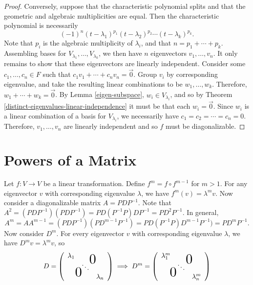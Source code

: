 \begin{proof}
    Conversely, suppose that the characteristic polynomial splits and that the geometric and algebraic multiplicities are equal. Then the characteristic polynomial is necessarily
    \[(-1)^n(t-\lambda_1)^{p_1}(t-\lambda_2)^{p_2}\cdots(t-\lambda_k)^{p_k}.\]
    Note that $p_i$ is the algebraic multiplicity of $\lambda_i$, and that $n = p_1 + \cdots + p_k$. Assembling bases for $V_{\lambda_1}, \ldots, V_{\lambda_k}$, we then have $n$ eigenvectors $v_1, \ldots, v_n$. It only remains to show that these eigenvectors are linearly independent. Consider some $c_1, \ldots, c_n \in F$ such that $c_1v_1 + \cdots + c_nv_n = \vec{0}$. Group $v_i$ by corresponding eigenvalue, and take the resulting linear combinations to be $w_1, \ldots, w_k$. Therefore, $w_1 + \cdots + w_k = \vec{0}$. By Lemma \ref{eigen-subspace}, $w_i \in V_{\lambda_i}$, and so by Theorem \ref{distinct-eigenvalues-linear-independence} it must be that each $w_i = \vec{0}$. Since $w_i$ is a linear combination of a basis for $V_{\lambda_i}$, we necessarily have $c_1 = c_2 = \cdots = c_n = 0$. Therefore, $v_1, \ldots, v_n$ are linearly independent and so $f$ must be diagonalizable.
\end{proof}

\section{Powers of a Matrix}

Let $f: V \to V$ be a linear transformation. Define $f^m = f \circ f^{m-1}$ for $m > 1$. For any eigenvector $v$ with corresponding eigenvalue $\lambda$, we have $f^m(v) = \lambda^{m}v$. Now consider a diagonalizable matrix $A = PDP^{-1}$. Note that $A^2 = (PDP^{-1})(PDP^{-1}) = PD(P^{-1}P)DP^{-1} = PD^2P^{-1}$. In general, \[A^m = AA^{m-1} = (PDP^{-1})(PD^{m-1}P^{-1}) = PD(P^{-1}P)D^{m-1}P^{-1}) = PD^mP^{-1}.\] Now consider $D^m$. For every eigenvector $v$ with corresponding eigenvalue $\lambda$, we have $D^mv = \lambda^mv$, so
\[D = \left(\begin{array}{ccc}
    \lambda_1 & \largeblock{2}{-0.7}{0} \\
    & \ddots & \\
    \largeblock{2}{0.7}{0} & \lambda_n \\
\end{array}
\right) \implies D^m =\left(\begin{array}{ccc}
    \lambda_1^m & \largeblock{2}{-0.7}{0} \\
    & \ddots & \\
    \largeblock{2}{0.7}{0} & \lambda_n^m \\
\end{array}
\right)\]

